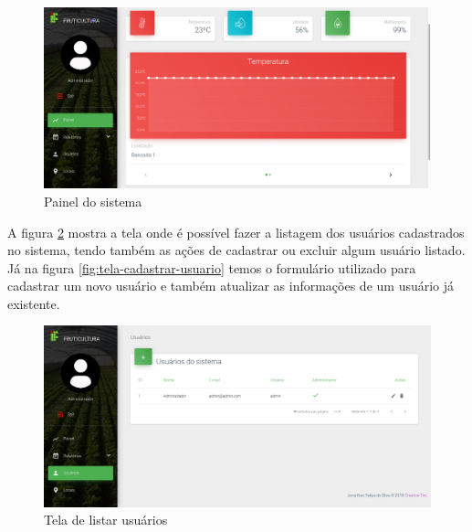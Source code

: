 \begin{figure}[H]
    \centering
    \includegraphics[scale=0.3]{04-figuras/tela_painel.png}
    \caption{Painel do sistema}
    \vspace{-\baselineskip}
    \label{fig:tela-dashboard}
\end{figure}

A figura \ref{fig:tela-listar-usuarios} mostra a tela onde é possível fazer a listagem dos usuários cadastrados no sistema, tendo também as ações de cadastrar ou excluir algum usuário listado. Já na figura \ref{fig:tela-cadastrar-usuario} temos o formulário utilizado para cadastrar um novo usuário e também atualizar as informações de um usuário já existente.

\begin{figure}[H]
    \centering
    \includegraphics[scale=0.3]{04-figuras/tela_listar_usuarios.png}
    \caption{Tela de listar usuários}
    \vspace{-\baselineskip}
    \label{fig:tela-listar-usuarios}
\end{figure}

